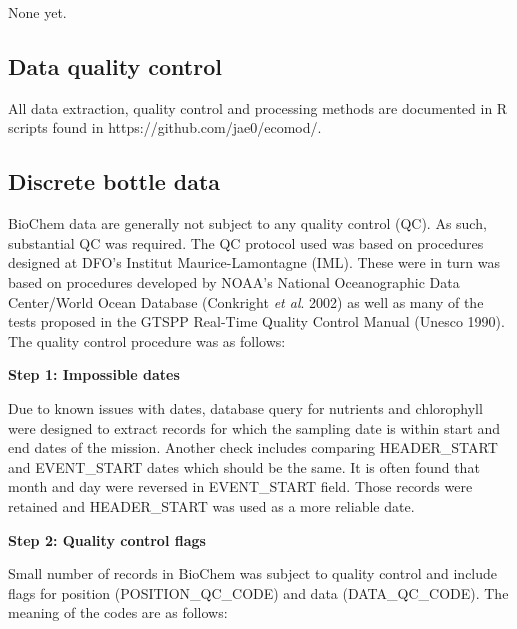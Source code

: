\documentclass[letterpaper,portrait,11pt]{scrartcl}
\numberwithin{equation}{section}		%
\numberwithin{figure}{section}		%
\numberwithin{table}{section}				%
\begin{document}

None yet.




\printbibliography


\begin{appendices}
  
\section{Data quality control}

All data extraction, quality control and processing methods are documented in R scripts found in https://github.com/jae0/ecomod/.

\subsection{Discrete bottle data}

BioChem data are generally not subject to any quality control (QC). As such, substantial QC was required. The QC protocol used was based on procedures designed at DFO's Institut Maurice-Lamontagne (IML). These were in turn was based on procedures developed by NOAA's National Oceanographic Data Center/World Ocean Database (Conkright \textit{et al}. 2002) as well as many of the tests proposed in the GTSPP Real-Time Quality Control Manual (Unesco 1990). The quality control procedure was as follows:

\textbf{Step 1: Impossible dates}

Due to known issues with dates, database query for nutrients and chlorophyll were designed to extract records for which the sampling date is within start and end dates of the mission. Another check includes comparing HEADER\_START and EVENT\_START dates which should be the same. It is often found that month and day were reversed in EVENT\_START field. Those records were retained and HEADER\_START was used as a more reliable date.

\textbf{Step 2: Quality control flags}

Small number of records in BioChem was subject to quality control and  include flags for position (POSITION\_QC\_CODE) and data (DATA\_QC\_CODE). The meaning of the codes are as follows:


\end{appendices}
\end{document}
